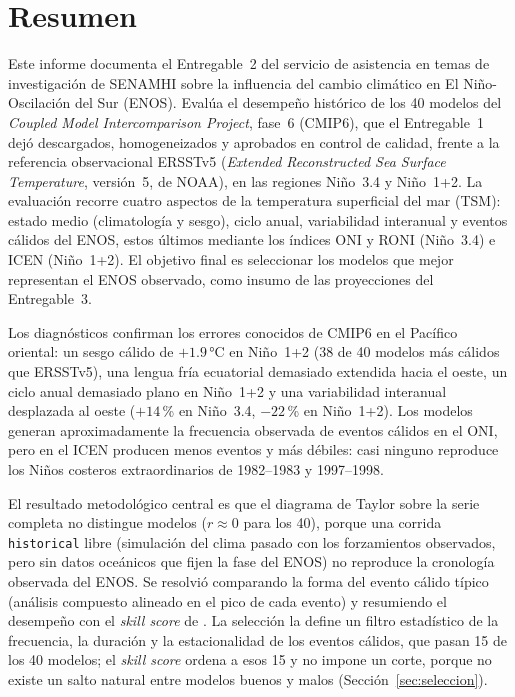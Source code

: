 \documentclass[11pt,a4paper]{article}
\begin{document}
\section{Resumen}

Este informe documenta el Entregable~2 del servicio de asistencia en temas de investigación de SENAMHI sobre la influencia del cambio climático en El Niño-Oscilación del Sur (ENOS). Evalúa el desempeño histórico de los 40 modelos del \emph{Coupled Model Intercomparison Project}, fase~6 (CMIP6), que el Entregable~1 dejó descargados, homogeneizados y aprobados en control de calidad, frente a la referencia observacional ERSSTv5 (\emph{Extended Reconstructed Sea Surface Temperature}, versión~5, de NOAA), en las regiones Niño~3.4 y Niño~1+2. La evaluación recorre cuatro aspectos de la temperatura superficial del mar (TSM): estado medio (climatología y sesgo), ciclo anual, variabilidad interanual y eventos cálidos del ENOS, estos últimos mediante los índices ONI y RONI (Niño~3.4) e ICEN (Niño~1+2). El objetivo final es seleccionar los modelos que mejor representan el ENOS observado, como insumo de las proyecciones del Entregable~3.

Los diagnósticos confirman los errores conocidos de CMIP6 en el Pacífico oriental: un sesgo cálido de $+1.9$\,°C en Niño~1+2 (38 de 40 modelos más cálidos que ERSSTv5), una lengua fría ecuatorial demasiado extendida hacia el oeste, un ciclo anual demasiado plano en Niño~1+2 y una variabilidad interanual desplazada al oeste ($+14$\,\% en Niño~3.4, $-22$\,\% en Niño~1+2). Los modelos generan aproximadamente la frecuencia observada de eventos cálidos en el ONI, pero en el ICEN producen menos eventos y más débiles: casi ninguno reproduce los Niños costeros extraordinarios de 1982--1983 y 1997--1998.

El resultado metodológico central es que el diagrama de Taylor sobre la serie completa no distingue modelos ($r \approx 0$ para los 40), porque una corrida \texttt{historical} libre (simulación del clima pasado con los forzamientos observados, pero sin datos oceánicos que fijen la fase del ENOS) no reproduce la cronología observada del ENOS. Se resolvió comparando la forma del evento cálido típico (análisis compuesto alineado en el pico de cada evento) y resumiendo el desempeño con el \emph{skill score} de \citet{taylor2001}. La selección la define un filtro estadístico de la frecuencia, la duración y la estacionalidad de los eventos cálidos, que pasan 15 de los 40 modelos; el \emph{skill score} ordena a esos 15 y no impone un corte, porque no existe un salto natural entre modelos buenos y malos (Sección~\ref{sec:seleccion}).
\end{document}
